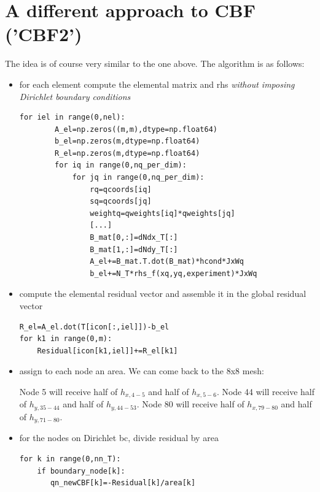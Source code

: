 \newpage
\section*{A different approach to CBF ('CBF2')}

The idea is of course very similar to the one above. 
The algorithm is as follows:
\begin{itemize}
\item for each element compute the elemental matrix and rhs {\it without
imposing Dirichlet boundary conditions}
\begin{lstlisting}
for iel in range(0,nel):
        A_el=np.zeros((m,m),dtype=np.float64)
        b_el=np.zeros(m,dtype=np.float64)
        R_el=np.zeros(m,dtype=np.float64)
        for iq in range(0,nq_per_dim):
            for jq in range(0,nq_per_dim):
                rq=qcoords[iq]
                sq=qcoords[jq]
                weightq=qweights[iq]*qweights[jq]
                [...]
                B_mat[0,:]=dNdx_T[:]
                B_mat[1,:]=dNdy_T[:]
                A_el+=B_mat.T.dot(B_mat)*hcond*JxWq
                b_el+=N_T*rhs_f(xq,yq,experiment)*JxWq
\end{lstlisting}

\item compute the elemental residual vector and assemble it in the 
global residual vector
\begin{lstlisting}
R_el=A_el.dot(T[icon[:,iel]])-b_el
for k1 in range(0,m):
    Residual[icon[k1,iel]]+=R_el[k1]
\end{lstlisting}

\item assign to each node an area. We can come back to the 8x8 mesh:
\begin{center}

\end{center}
Node {\color{teal}5} will receive half of $h_{x,4-5}$ and half of $h_{x,5-6}$.
Node {\color{teal}44} will receive half of $h_{y,35-44}$ and half of $h_{y,44-53}$.
Node {\color{teal} 80} will receive half of $h_{x,79-80}$ and half of $h_{y,71-80}$.

\item for the nodes on Dirichlet bc, divide residual by area
\begin{lstlisting}
for k in range(0,nn_T):
    if boundary_node[k]:
       qn_newCBF[k]=-Residual[k]/area[k]
\end{lstlisting}

\end{itemize}

